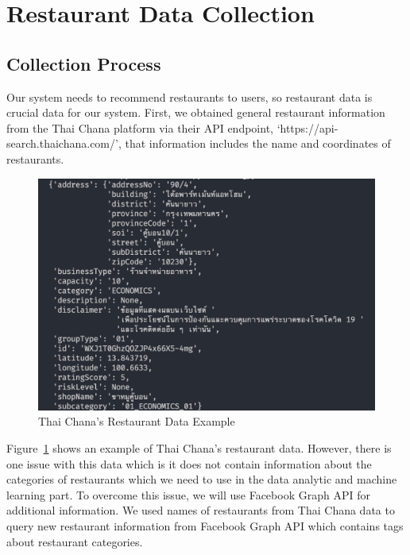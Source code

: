 \documentclass[12pt,oneside,openright,a4paper]{cpe-english-project}
\begin{document}
\section{Restaurant Data Collection}

\subsection{Collection Process}


Our system needs to recommend restaurants to users, so restaurant data is crucial data for our system. First, we obtained general restaurant information from the Thai Chana platform via their API endpoint, ‘https://api-search.thaichana.com/’, that information includes the name and coordinates of restaurants.

\begin{figure}[H]\centering
\includegraphics[width=400pt]{./images/4ThaiChanasRestaurantDataExample.png}
\caption{Thai Chana’s Restaurant Data Example}\label{fig:4ThaiChanasRestaurantDataExample}
\end{figure}

Figure~\ref{fig:4ThaiChanasRestaurantDataExample} shows an example of Thai Chana’s restaurant data. However, there is one issue with this data which is it does not contain information about the categories of restaurants which we need to use in the data analytic and machine learning part. To overcome this issue, we will use Facebook Graph API for additional information. We used names of restaurants from Thai Chana data to query new restaurant information from Facebook Graph API which contains tags about restaurant categories.
\end{document}
